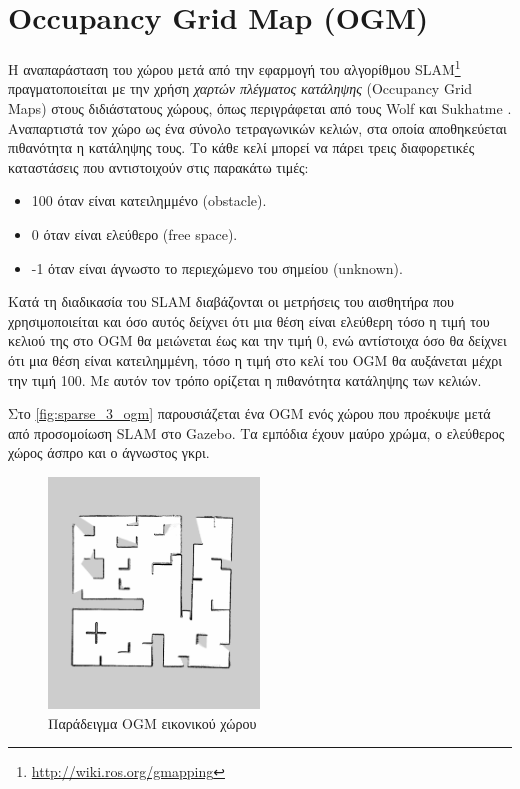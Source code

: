 \section{Occupancy Grid Map (OGM)}
\label{section:ogm}

Η αναπαράσταση του χώρου μετά από την εφαρμογή του αλγορίθμου SLAM\footnote{\href{http://wiki.ros.org/gmapping}{http://wiki.ros.org/gmapping}} πραγματοποιείται με την χρήση \emph{χαρτών πλέγματος κατάληψης} (Occupancy Grid Maps) στους διδιάστατους χώρους, όπως περιγράφεται από τους Wolf και Sukhatme \cite{ogm2005}. Αναπαρτιστά τον χώρο ως ένα σύνολο τετραγωνικών κελιών, στα οποία αποθηκεύεται πιθανότητα η κατάληψης τους. Το κάθε κελί μπορεί να πάρει τρεις διαφορετικές καταστάσεις που αντιστοιχούν στις παρακάτω τιμές:
\begin{itemize}
    \setlength\itemsep{-0.2em}
    \item 100 όταν είναι κατειλημμένο (obstacle).
    \item 0 όταν είναι ελεύθερο (free space).
    \item -1 όταν είναι άγνωστο το περιεχώμενο του σημείου (unknown).
\end{itemize}
Κατά τη διαδικασία του SLAM διαβάζονται οι μετρήσεις του αισθητήρα που χρησιμοποιείται και όσο αυτός δείχνει ότι μια θέση είναι ελεύθερη τόσο η τιμή του κελιού της στο OGM θα μειώνεται έως και την τιμή 0, ενώ αντίστοιχα όσο θα δείχνει ότι μια θέση είναι κατειλημμένη, τόσο η τιμή στο κελί του OGM θα αυξάνεται μέχρι την τιμή 100. Με αυτόν τον τρόπο ορίζεται η πιθανότητα κατάληψης των κελιών.

Στο \autoref{fig:sparse_3_ogm} παρουσιάζεται ένα OGM ενός χώρου που προέκυψε μετά από προσομοίωση SLAM στο Gazebo. Τα εμπόδια έχουν μαύρο χρώμα, ο ελεύθερος χώρος άσπρο και ο άγνωστος γκρι.
\begin{figure}
    \centering
    \includegraphics[width=0.5\textwidth]{./images/chapter3/sparse_3.png}
    \caption{Παράδειγμα ΟGM εικονικού χώρου}
    \label{fig:sparse_3_ogm}
\end{figure}




